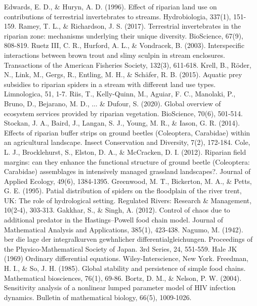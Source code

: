 \documentclass[12pt]{article}
\numberwithin{equation}{section}
\begin{document}
\begin{thebibliography}{99}
  Edwards, E. D., \& Huryn, A. D. (1996). Effect of riparian land use on contributions of terrestrial invertebrates to streams. Hydrobiologia, 337(1), 151-159.
  Ramey, T. L., \& Richardson, J. S. (2017). Terrestrial invertebrates in the riparian zone: mechanisms underlying their unique diversity. BioScience, 67(9), 808-819.
  Ruetz III, C. R., Hurford, A. L., \& Vondracek, B. (2003). Interspecific interactions between brown trout and slimy sculpin in stream enclosures. Transactions of the American Fisheries Society, 132(3), 611-618.
  Krell, B., Röder, N., Link, M., Gergs, R., Entling, M. H., \& Schäfer, R. B. (2015). Aquatic prey subsidies to riparian spiders in a stream with different land use types. Limnologica, 51, 1-7.
  Riis, T., Kelly-Quinn, M., Aguiar, F. C., Manolaki, P., Bruno, D., Bejarano, M. D., ... \& Dufour, S. (2020). Global overview of ecosystem services provided by riparian vegetation. BioScience, 70(6), 501-514.
  Stockan, J. A., Baird, J., Langan, S. J., Young, M. R., \& Iason, G. R. (2014). Effects of riparian buffer strips on ground beetles (Coleoptera, Carabidae) within an agricultural landscape. Insect Conservation and Diversity, 7(2), 172-184.
  Cole, L. J., Brocklehurst, S., Elston, D. A., \& McCracken, D. I. (2012). Riparian field margins: can they enhance the functional structure of ground beetle (Coleoptera: Carabidae) assemblages in intensively managed grassland landscapes?. Journal of Applied Ecology, 49(6), 1384-1395.
  Greenwood, M. T., Bickerton, M. A., \& Petts, G. E. (1995). Patial distribution of spiders on the floodplain of the river trent, UK: The role of hydrological setting. Regulated Rivers: Research \& Management, 10(2‐4), 303-313.
  Gakkhar, S., \& Singh, A. (2012). Control of chaos due to additional predator in the Hastings–Powell food chain model. Journal of Mathematical Analysis and Applications, 385(1), 423-438.
  Nagumo, M. (1942). ber die lage der integralkurven gewhnlicher differentialgleichungen. Proceedings of the Physico-Mathematical Society of Japan. 3rd Series, 24, 551-559.
  Hale JK (1969) Ordinary differential equations. Wiley-Interscience, New York.
  Freedman, H. I., \& So, J. H. (1985). Global stability and persistence of simple food chains. Mathematical biosciences, 76(1), 69-86.
  Bortz, D. M., \& Nelson, P. W. (2004). Sensitivity analysis of a nonlinear lumped parameter model of HIV infection dynamics. Bulletin of mathematical biology, 66(5), 1009-1026.
\end{thebibliography}
\end{document}
